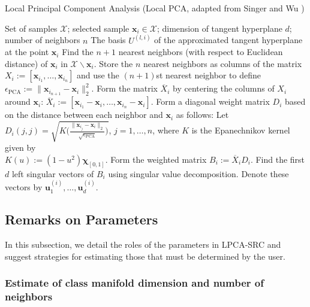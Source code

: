 \documentclass[review]{elsarticle}
\begin{document}
\begin{algorithm}
\caption{Local Principal Component Analysis (Local PCA, adapted from Singer and Wu \cite{sin:vdm})}
\label{alg1}
\begin{algorithmic}[1]
\REQUIRE Set of samples $\mathcal{X}$; selected sample $\bm{x}_i \in \mathcal{X}$; dimension of tangent hyperplane $d$; number of neighbors $n$
\ENSURE The basis $U^{(l,i)}$ of the approximated tangent hyperplane at the point $\bm{x}_i$
\STATE Find the $n+1$ nearest neighbors (with respect to Euclidean distance) of $\bm{x}_i$ in $\mathcal{X}\backslash \bm{x}_i$. Store the $n$ nearest neighbors as columns of the matrix $X_i := [\bm{x}_{i_1},\ldots,\bm{x}_{i_n}]$ and use the $(n+1)$st nearest neighbor to define 
$\epsilon_\mathrm{PCA} := \|\bm{x}_{i_{n+1}} - \bm{x}_i\|_2^2$.
\STATE Form the matrix $\overline{X}_i$ by centering the columns of $X_i$ around $\bm{x}_i$: $\overline{X}_i := [\bm{x}_{i_1}-\bm{x}_i,\ldots, \bm{x}_{i_n}-\bm{x}_i]$.
\STATE Form a diagonal weight matrix $D_i$ based on the distance between each neighbor and $\bm{x}_i$ as follows: Let \\
$D_i(j,j) = \sqrt{K\Big(\frac{\|\bm{x}_{i_j}-\bm{x}_i\|_2}{\sqrt{\epsilon_\mathrm{PCA}}}\Big)}$, $j=1,\ldots,n$, where $K$ is the Epanechnikov kernel given by \\
$K(u) := (1-u^2)\bm{\chi}_{[0,1]}$.
\STATE Form the weighted matrix $B_i :=\overline{X}_iD_i$.
\STATE Find the first $d$ left singular vectors of $B_i$ using singular value decomposition. Denote these vectors by $\bm{u}_1^{(i)},\ldots,\bm{u}_d^{(i)}$.
\end{algorithmic}
\end{algorithm}



\subsection{Remarks on Parameters} \label{sec:pars}

In this subsection, we detail the roles of the parameters in LPCA-SRC and suggest strategies for estimating those that must be determined by the user. 

\subsubsection{Estimate of class manifold dimension and number of neighbors} \label{sec:pars_dn}
\end{document}
